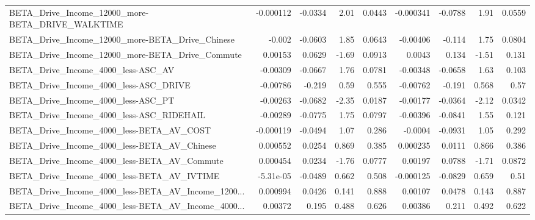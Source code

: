 \begin{tabular}{lrrrrrrrr}
BETA\_Drive\_Income\_12000\_more-BETA\_DRIVE\_WALKTIME   &   -0.000112 &      -0.0334 &     2.01 &   0.0443 &  -0.000341 &     -0.0788 &         1.91 &        0.0559 \\
BETA\_Drive\_Income\_12000\_more-BETA\_Drive\_Chinese    &      -0.002 &      -0.0603 &     1.85 &   0.0643 &   -0.00406 &      -0.114 &         1.75 &        0.0804 \\
BETA\_Drive\_Income\_12000\_more-BETA\_Drive\_Commute    &     0.00153 &       0.0629 &    -1.69 &   0.0913 &     0.0043 &       0.134 &        -1.51 &         0.131 \\
BETA\_Drive\_Income\_4000\_less-ASC\_AV                 &    -0.00309 &      -0.0667 &     1.76 &   0.0781 &   -0.00348 &     -0.0658 &         1.63 &         0.103 \\
BETA\_Drive\_Income\_4000\_less-ASC\_DRIVE              &    -0.00786 &       -0.219 &     0.59 &    0.555 &   -0.00762 &      -0.191 &        0.568 &          0.57 \\
BETA\_Drive\_Income\_4000\_less-ASC\_PT                 &    -0.00263 &      -0.0682 &    -2.35 &   0.0187 &   -0.00177 &     -0.0364 &        -2.12 &        0.0342 \\
BETA\_Drive\_Income\_4000\_less-ASC\_RIDEHAIL           &    -0.00289 &      -0.0775 &     1.75 &   0.0797 &   -0.00396 &     -0.0841 &         1.55 &         0.121 \\
BETA\_Drive\_Income\_4000\_less-BETA\_AV\_COST           &   -0.000119 &      -0.0494 &     1.07 &    0.286 &    -0.0004 &     -0.0931 &         1.05 &         0.292 \\
BETA\_Drive\_Income\_4000\_less-BETA\_AV\_Chinese        &    0.000552 &       0.0254 &    0.869 &    0.385 &   0.000235 &      0.0111 &        0.866 &         0.386 \\
BETA\_Drive\_Income\_4000\_less-BETA\_AV\_Commute        &    0.000454 &       0.0234 &    -1.76 &   0.0777 &    0.00197 &      0.0788 &        -1.71 &        0.0872 \\
BETA\_Drive\_Income\_4000\_less-BETA\_AV\_IVTIME         &   -5.31e-05 &      -0.0489 &    0.662 &    0.508 &  -0.000125 &     -0.0829 &        0.659 &          0.51 \\
BETA\_Drive\_Income\_4000\_less-BETA\_AV\_Income\_1200... &    0.000994 &       0.0426 &    0.141 &    0.888 &    0.00107 &      0.0478 &        0.143 &         0.887 \\
BETA\_Drive\_Income\_4000\_less-BETA\_AV\_Income\_4000... &     0.00372 &        0.195 &    0.488 &    0.626 &    0.00386 &       0.211 &        0.492 &         0.622 \\

\end{tabular}
